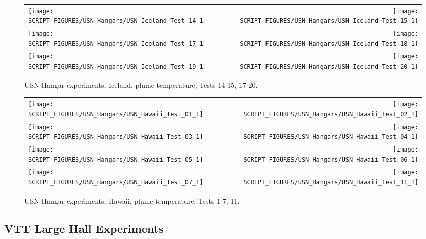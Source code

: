 \begin{figure}[p]
\begin{tabular*}{\textwidth}{l@{\extracolsep{\fill}}r}
\texttt{[image: SCRIPT\_FIGURES/USN\_Hangars/USN\_Iceland\_Test\_14\_1]} &
\texttt{[image: SCRIPT\_FIGURES/USN\_Hangars/USN\_Iceland\_Test\_15\_1]} \\
\texttt{[image: SCRIPT\_FIGURES/USN\_Hangars/USN\_Iceland\_Test\_17\_1]} &
\texttt{[image: SCRIPT\_FIGURES/USN\_Hangars/USN\_Iceland\_Test\_18\_1]} \\
\texttt{[image: SCRIPT\_FIGURES/USN\_Hangars/USN\_Iceland\_Test\_19\_1]} &
\texttt{[image: SCRIPT\_FIGURES/USN\_Hangars/USN\_Iceland\_Test\_20\_1]} \\
\end{tabular*}
\caption[USN Hangar experiments, Iceland, plume temperature, Tests 14-15, 17-20]
{USN Hangar experiments, Iceland, plume temperature, Tests 14-15, 17-20.}
\label{USN_Plume_Iceland_3}
\end{figure}

\begin{figure}[p]
\begin{tabular*}{\textwidth}{l@{\extracolsep{\fill}}r}
\texttt{[image: SCRIPT\_FIGURES/USN\_Hangars/USN\_Hawaii\_Test\_01\_1]} &
\texttt{[image: SCRIPT\_FIGURES/USN\_Hangars/USN\_Hawaii\_Test\_02\_1]} \\
\texttt{[image: SCRIPT\_FIGURES/USN\_Hangars/USN\_Hawaii\_Test\_03\_1]} &
\texttt{[image: SCRIPT\_FIGURES/USN\_Hangars/USN\_Hawaii\_Test\_04\_1]} \\
\texttt{[image: SCRIPT\_FIGURES/USN\_Hangars/USN\_Hawaii\_Test\_05\_1]} &
\texttt{[image: SCRIPT\_FIGURES/USN\_Hangars/USN\_Hawaii\_Test\_06\_1]} \\
\texttt{[image: SCRIPT\_FIGURES/USN\_Hangars/USN\_Hawaii\_Test\_07\_1]} &
\texttt{[image: SCRIPT\_FIGURES/USN\_Hangars/USN\_Hawaii\_Test\_11\_1]}
\end{tabular*}
\caption[USN Hangar experiments, Hawaii, plume temperature, Tests 1-7, 11]
{USN Hangar experiments, Hawaii, plume temperature, Tests 1-7, 11.}
\label{USN_Plume_Hawaii}
\end{figure}

\clearpage

\subsection{VTT Large Hall Experiments}

